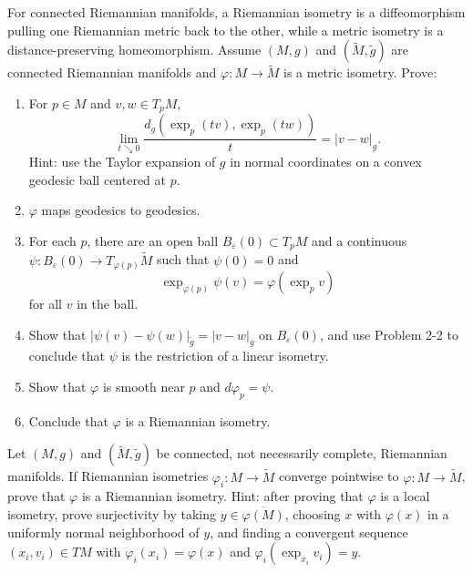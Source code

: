 \begin{exercise}
\label{prob:metric-isometry-characterization}
\label{prob:exponential-distance-limit}

For connected Riemannian manifolds, a Riemannian isometry is a diffeomorphism
pulling one Riemannian metric back to the other, while a metric isometry is a
distance-preserving homeomorphism.
Assume $(M,g)$ and $(\widetilde M,\widetilde g)$ are connected Riemannian
manifolds and $\varphi:M\to\widetilde M$ is a metric isometry.  Prove:
\begin{enumerate}
\item[(a)] For $p\in M$ and $v,w\in T_pM$,
\[
\lim_{t\searrow0}\frac{d_g(\exp_p(tv),\exp_p(tw))}{t}=|v-w|_g.
\]
Hint: use the Taylor expansion of $g$ in normal coordinates on a convex
geodesic ball centered at $p$.
\item[(b)] $\varphi$ maps geodesics to geodesics.
\item[(c)] For each $p$, there are an open ball $B_\varepsilon(0)\subset T_pM$
and a continuous $\psi:B_\varepsilon(0)\to T_{\varphi(p)}\widetilde M$ such that
$\psi(0)=0$ and
\[
\exp_{\varphi(p)}\psi(v)=\varphi(\exp_pv)
\]
for all $v$ in the ball.
\item[(d)] Show that
$|\psi(v)-\psi(w)|_{\widetilde g}=|v-w|_g$ on $B_\varepsilon(0)$, and use
Problem 2-2 to conclude that $\psi$ is the restriction of a linear isometry.
\item[(e)] Show that $\varphi$ is smooth near $p$ and $d\varphi_p=\psi$.
\item[(f)] Conclude that $\varphi$ is a Riemannian isometry.
\end{enumerate}
\end{exercise}

\begin{exercise}
\label{prob:limit-isometry}

Let $(M,g)$ and $(\widetilde M,\widetilde g)$ be connected, not necessarily
complete, Riemannian manifolds.  If Riemannian isometries
$\varphi_i:M\to\widetilde M$ converge pointwise to $\varphi:M\to\widetilde M$,
prove that $\varphi$ is a Riemannian isometry.  Hint: after proving that
$\varphi$ is a local isometry, prove surjectivity by taking
$y\in\overline{\varphi(M)}$, choosing $x$ with $\varphi(x)$ in a uniformly
normal neighborhood of $y$, and finding a convergent sequence
$(x_i,v_i)\in TM$ with
$\varphi_i(x_i)=\varphi(x)$ and $\varphi_i(\exp_{x_i}v_i)=y$.
\end{exercise}

